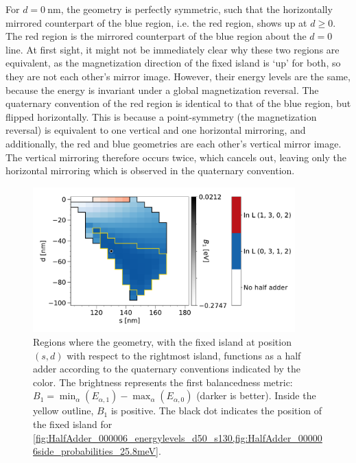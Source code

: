 \documentclass[11pt,a4paper,english,twoside]{article}
\begin{document}
For $d=\SI{0}{\nano\metre}$, the geometry is perfectly symmetric, such that the horizontally mirrored counterpart of the blue region, i.e. the red region, shows up at $d \geq 0$. The red region is the mirrored counterpart of the blue region about the $d=0$ line. At first sight, it might not be immediately clear why these two regions are equivalent, as the magnetization direction of the fixed island is `up' for both, so they are not each other's mirror image. However, their energy levels are the same, because the energy is invariant under a global magnetization reversal. The quaternary convention of the red region is identical to that of the blue region, but flipped horizontally. This is because a point-symmetry (the magnetization reversal) is equivalent to one vertical and one horizontal mirroring, and additionally, the red and blue geometries are each other's vertical mirror image. The vertical mirroring therefore occurs twice, which cancels out, leaving only the horizontal mirroring which is observed in the quaternary convention. \par
\begin{figure}
    \centering
    \includegraphics[width=0.9\textwidth]{Figures/half_adder/sweep/000006_d-s/tableside(d0-100_5,s100-180_5)_balanced1.pdf}
    \caption{Regions where the geometry, with the fixed island at position $(s, d)$ with respect to the rightmost island, functions as a half adder according to the quaternary conventions indicated by the color. The brightness represents the first balancedness metric: $B_1 = \min_\alpha(E_{\alpha,1}) - \max_\alpha(E_{\alpha,0})$ (darker is better). Inside the yellow outline, $B_1$ is positive. The black dot indicates the position of the fixed island for \cref{fig:HalfAdder_000006_energylevels_d50_s130,fig:HalfAdder_000006side_probabilities_25.8meV}.}
    \label{fig:HalfAdder_000006_sweepnew_d-s_balanced1}
\end{figure}
\end{document}

